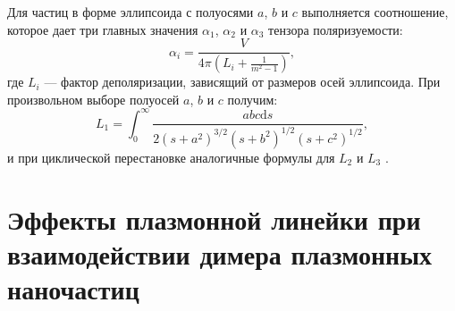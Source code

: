 Для частиц в форме эллипсоида с полуосями $ a $, $ b $ и $ c $ выполняется соотношение, которое дает три главных значения $ \alpha_1 $, $ \alpha_2 $ и $ \alpha_3 $ тензора поляризуемости:
\begin{equation}
\alpha _i = \frac{V}{4 \pi (L_i + \frac{1}{m^2 - 1})},
\label{eq:polarizabilityEllip}
\end{equation}
где $ L_i $ --- фактор деполяризации, зависящий от размеров осей эллипсоида. При произвольном выборе полуосей $ a $, $ b $ и $ c $ получим:
\begin{equation}
L_1 = \int_0^\infty \frac{a b c \mathrm{d} s}{2 (s + a^2)^{3/2} (s + b^2)^{1/2} (s + c^2)^{1/2}},
\label{eq:Lfactor}
\end{equation}
и при циклической перестановке аналогичные формулы для $ L_2 $ и $ L_3 $ \cite{LPP_Hulst}.

\section{Эффекты плазмонной линейки при взаимодействии димера плазмонных наночастиц}

